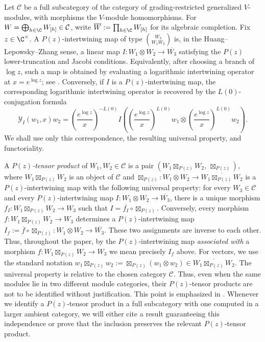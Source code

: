 \documentclass[12pt,leqno]{amsart}
\numberwithin{equation}{section} \newtheorem{thm}{Theorem}[section] \newtheorem{lem}[thm]{Lemma} \newtheorem{ex}[thm]{Example} \newtheorem{prop}[thm]{Proposition} \newtheorem{cor}[thm]{Corollary} \newtheorem{defi}[thm]{Definition} \newtheorem{rmk}[thm]{Remark} \newtheorem{notation}[thm]{Notation}
\begin{document}
Let $\mathcal C$ be a full subcategory of the category of grading-restricted generalized $V$-modules, with morphisms the $V$-module homomorphisms. For \(W=\bigoplus_{h\in\C}W_{[h]}\in\mathcal C\), write \(\overline W:=\prod_{h\in\C}W_{[h]}\) for its algebraic completion. Fix $z\in\C^\times$. A $P(z)$-intertwining map of type \(\binom{W_3}{W_1 W_2}\) is, in the Huang--Lepowsky--Zhang sense, a linear map \(I:W_1\otimes W_2\longrightarrow\overline{W_3}\) satisfying the $P(z)$ lower-truncation and Jacobi conditions. Equivalently, after choosing a branch of $\log z$, such a map is obtained by evaluating a logarithmic intertwining operator at $x=e^{\log z}$; see \cite[\S2.1]{McRae}. Conversely, if $I$ is a $P(z)$-intertwining map, the corresponding logarithmic intertwining operator is recovered by the $L(0)$-conjugation formula
\begin{equation}\label{eq:Pz-inverse}
\mathcal Y_I(w_1,x)w_2
=
\left(\frac{e^{\log z}}{x}\right)^{-L(0)}
I\left(
\left(\frac{e^{\log z}}{x}\right)^{L(0)}w_1
\otimes
\left(\frac{e^{\log z}}{x}\right)^{L(0)}w_2
\right).
\end{equation}
We shall use only this correspondence, the resulting universal property, and functoriality.

A \emph{$P(z)$-tensor product} of $W_1,W_2\in\mathcal C$ is a pair \(\left(W_1\boxtimes_{P(z)}W_2,\ \boxtimes_{P(z)}\right),\) where $W_1\boxtimes_{P(z)}W_2$ is an object of $\mathcal C$ and \(\boxtimes_{P(z)}:W_1\otimes W_2\longrightarrow\overline{W_1\boxtimes_{P(z)}W_2}\) is a $P(z)$-intertwining map with the following universal property: for every $W_3\in\mathcal C$ and every $P(z)$-intertwining map \(I:W_1\otimes W_2\longrightarrow\overline{W_3}\), there is a unique morphism \(f_I:W_1\boxtimes_{P(z)}W_2\longrightarrow W_3\) such that \(I=\overline{f_I}\circ\boxtimes_{P(z)}.\) Conversely, every morphism \(f:W_1\boxtimes_{P(z)}W_2\longrightarrow W_3\) determines a $P(z)$-intertwining map \(I_f:=\overline f\circ\boxtimes_{P(z)}:W_1\otimes W_2\longrightarrow\overline{W_3}.\) These two assignments are inverse to each other. Thus, throughout the paper, by the $P(z)$-intertwining map \emph{associated with} a morphism $f:W_1\boxtimes_{P(z)}W_2\to W_3$ we mean precisely $I_f$ above. For vectors, we use the standard notation \(w_1\boxtimes_{P(z)}w_2:=\boxtimes_{P(z)}(w_1\otimes w_2)\in\overline{W_1\boxtimes_{P(z)}W_2}.\) The universal property is relative to the chosen category $\mathcal C$. Thus, even when the same modules lie in two different module categories, their $P(z)$-tensor products are not to be identified without justification. This point is emphasized in \cite[Remark~2.3]{McRae}. Whenever we identify a $P(z)$-tensor product in a full subcategory with one computed in a larger ambient category, we will either cite a result guaranteeing this independence or prove that the inclusion preserves the relevant $P(z)$-tensor product.
\end{document}

